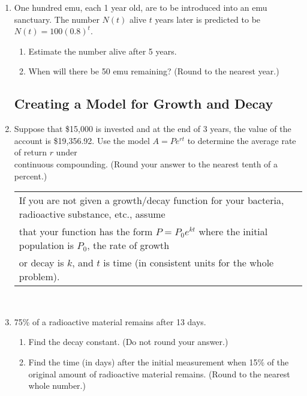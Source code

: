 \begin{enumerate}
\item One hundred emu, each 1 year old, are to be introduced into an emu sanctuary.  The number $N(t)$ alive $t$ years later is predicted to be $N(t)=100(0.8)^t$.
\begin{enumerate}
\item Estimate the number alive after 5 years.\\[.3in]
\item When will there be 50 emu remaining? (Round to the nearest year.)\\[1in]
\end{enumerate}


\subsection{Creating a Model for Growth and Decay}

\item Suppose that \$15,000 is invested and at the end of 3 years, the value of the account is \$19,356.92.  Use the model $A=Pe^{rt}$ to determine the average rate of return $r$ under \\continuous compounding. (Round your answer to the nearest tenth of a percent.)

\newpage

\noindent \begin{tabular}{| l |} \hline
If you are not given a growth/decay function for your bacteria, radioactive substance, etc., assume\\ that your function has the form $P=P_0e^{kt}$ where the initial population is $P_0$, the rate of growth \\or decay is $k$, and $t$ is time (in consistent units for the whole problem).\\ \hline
\end{tabular} \\

\item 75\% of a radioactive material remains after 13 days. 
\begin{enumerate}
\item Find the decay constant. (Do not round your answer.)\\[1.5in]
\item Find the time (in days) after the initial measurement when 15\% of the original amount of radioactive material remains. (Round to the nearest whole number.) \\[2.5in]
\end{enumerate}



\end{enumerate}
